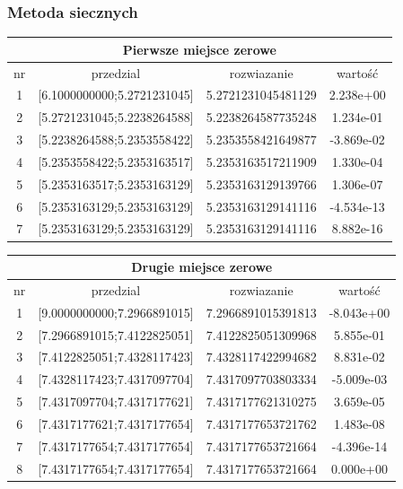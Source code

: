 \documentclass[11pt, oneside]{article}   	%
\begin{document}
\subsubsection{Metoda siecznych}

\begin{center}
\begin{tabular}{ |c|c|c|c| } 
\hline
\multicolumn{4}{|c|}{Pierwsze miejsce zerowe} \\
 \hline
 nr & przedzial & rozwiazanie & wartość \\
 \hline
  1 & [6.1000000000;5.2721231045] & 5.2721231045481129 &    2.238e+00 \\ 
  2 & [5.2721231045;5.2238264588] & 5.2238264587735248 &    1.234e-01 \\ 
  3 & [5.2238264588;5.2353558422] & 5.2353558421649877 &   -3.869e-02 \\ 
  4 & [5.2353558422;5.2353163517] & 5.2353163517211909 &    1.330e-04 \\ 
  5 & [5.2353163517;5.2353163129] & 5.2353163129139766 &    1.306e-07 \\ 
  6 & [5.2353163129;5.2353163129] & 5.2353163129141116 &   -4.534e-13 \\ 
  7 & [5.2353163129;5.2353163129] & 5.2353163129141116 &    8.882e-16 \\ 
 \hline
\end{tabular}
\end{center}

\begin{center}
\begin{tabular}{ |c|c|c|c| } 
\hline
\multicolumn{4}{|c|}{Drugie miejsce zerowe} \\
 \hline
 nr & przedzial & rozwiazanie & wartość \\
 \hline
1 & [9.0000000000;7.2966891015] & 7.2966891015391813 &   -8.043e+00 \\ 
  2 & [7.2966891015;7.4122825051] & 7.4122825051309968 &    5.855e-01 \\ 
  3 & [7.4122825051;7.4328117423] & 7.4328117422994682 &    8.831e-02 \\ 
  4 & [7.4328117423;7.4317097704] & 7.4317097703803334 &   -5.009e-03 \\ 
  5 & [7.4317097704;7.4317177621] & 7.4317177621310275 &    3.659e-05 \\ 
  6 & [7.4317177621;7.4317177654] & 7.4317177653721762 &    1.483e-08 \\ 
  7 & [7.4317177654;7.4317177654] & 7.4317177653721664 &   -4.396e-14 \\ 
  8 & [7.4317177654;7.4317177654] & 7.4317177653721664 &    0.000e+00 \\ 
 \hline
\end{tabular}
\end{center}
\end{document}
